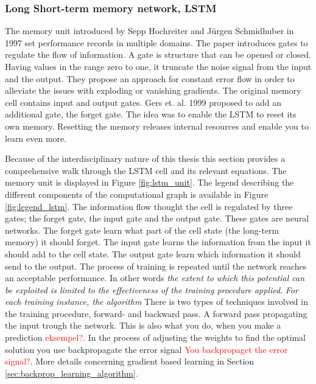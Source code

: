 \documentclass{article}
\begin{document}
\subsubsection{Long Short-term memory network, LSTM} \label{sec:lstm}
The memory unit introduced by Sepp Hochreiter and Jürgen Schmidhuber in 1997 set performance records in multiple domains. The paper introduces gates to regulate the flow of information. A gate is structure that can be opened or closed. Having values in the range zero to one, it truncate the noise signal from the input and the output. They propose an approach for constant error flow in order to alleviate the issues with exploding or vanishing gradients. The original memory cell contains input and output gates. Gers et. al. 1999 proposed to add an additional gate, the forget gate. The idea was to enable the LSTM to reset its own memory. Resetting the memory releases internal resources and enable you to learn even more.

Because of the interdisciplinary nature of this thesis this section provides a comprehensive walk through the LSTM cell and its relevant equations. The memory unit is displayed in Figure \ref{fig:lstm_unit}. The legend describing the different components of the computational graph is available in Figure \ref{fig:legend_lstm}. The information flow thought the cell is regulated by three gates; the forget gate, the input gate and the output gate. These gates are neural networks. The forget gate learn what part of the cell state (the long-term memory) it should forget. The input gate learns the information from the input it should add to the cell state. The output gate learn which information it should send to the output. The process of training is repeated until the network reaches an acceptable performance. In other words \textit{the extent to which this potential can be exploited is limited to the effectiveness of the training procedure applied}. 
\textit{For each training instance,  the algorithm }
There is two types of techniques involved in the training procedure, forward- and backward pass. A forward pass 
propagating the input trough the network. This is also what you do, when you make a prediction \textcolor{red}{eksempel?}. In the process of adjusting the weights to find the optimal solution you use backpropagate the error signal \textcolor{red}{You backpropaget the error signal?}. More details concerning gradient based learning in Section \ref{sec:backprop_learning_algorithm}.
\end{document}
